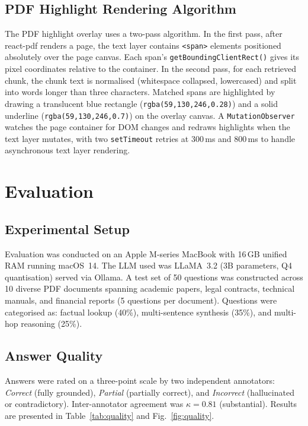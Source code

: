 \documentclass[conference]{IEEEtran}
\begin{document}
\subsection{PDF Highlight Rendering Algorithm}
The PDF highlight overlay uses a two-pass algorithm.
In the first pass, after react-pdf renders a page, the text layer
contains \texttt{<span>} elements positioned absolutely over the page
canvas.
Each span's \texttt{getBoundingClientRect()} gives its pixel coordinates
relative to the container.
In the second pass, for each retrieved chunk, the chunk text is
normalised (whitespace collapsed, lowercased) and split into words
longer than three characters.
Matched spans are highlighted by drawing a translucent blue rectangle
(\texttt{rgba(59,130,246,0.28)}) and a solid underline
(\texttt{rgba(59,130,246,0.7)}) on the overlay canvas.
A \texttt{MutationObserver} watches the page container for DOM changes
and redraws highlights when the text layer mutates, with two
\texttt{setTimeout} retries at 300\,ms and 800\,ms to handle
asynchronous text layer rendering.

\section{Evaluation}
\label{sec:eval}

\subsection{Experimental Setup}
Evaluation was conducted on an Apple M-series MacBook with 16\,GB
unified RAM running macOS~14.
The LLM used was LLaMA~3.2 (3B parameters, Q4 quantisation) served via
Ollama.
A test set of 50 questions was constructed across 10 diverse PDF
documents spanning academic papers, legal contracts, technical manuals,
and financial reports (5 questions per document).
Questions were categorised as: factual lookup (40\%), multi-sentence
synthesis (35\%), and multi-hop reasoning (25\%).

\subsection{Answer Quality}
Answers were rated on a three-point scale by two independent annotators:
\emph{Correct} (fully grounded), \emph{Partial} (partially correct),
and \emph{Incorrect} (hallucinated or contradictory).
Inter-annotator agreement was $\kappa=0.81$ (substantial).
Results are presented in Table~\ref{tab:quality} and
Fig.~\ref{fig:quality}.
\end{document}
